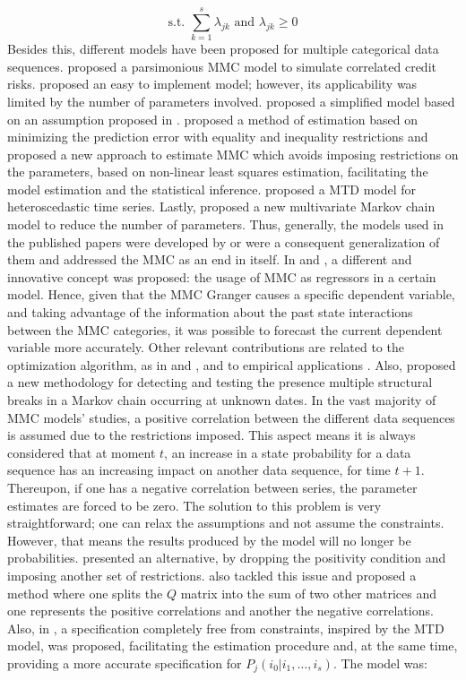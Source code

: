 \[ \text{s.t. } \sum_{k=1}^s \lambda_{jk} \text{ and } \lambda_{jk}  \geq 0 \] Besides this, different models have been proposed for multiple categorical data sequences. \citet{Kijima2002} proposed a parsimonious MMC model to simulate correlated credit risks. \citet{Siu2005} proposed an easy to implement model; however, its applicability was limited by the number of parameters involved. \citet{Ching2008} proposed a simplified model based on an assumption proposed in \citet{Zhang2006}. \citet{Zhu2010} proposed a method of estimation based on minimizing the prediction error with equality and inequality restrictions and \citet{Nicolau_2014} proposed a new approach to estimate MMC which avoids imposing restrictions on the parameters, based on non-linear least squares estimation, facilitating the model estimation and the statistical inference. \citet{Berchtold2003} proposed a MTD model for heteroscedastic time series. Lastly, \citet{Wang2014} proposed a new multivariate Markov chain model to reduce the number of parameters. Thus, generally, the models used in the published papers were developed by \citet{Ching2002} or were a consequent generalization of them and addressed the MMC as an end in itself. In \citet{Damasio2013} and \citet{DAMASIO2014}, a different and innovative concept was proposed: the usage of MMC as regressors in a certain model. Hence, given that the MMC Granger causes a specific dependent variable, and taking advantage of the information about the past state interactions between the MMC categories, it was possible to forecast the current dependent variable more accurately. Other relevant contributions are related to the optimization algorithm, as in \citet{Lebre2008} and \citet{ChenLio2009}, and to empirical applications \citep{Ching2003, Ching2006, Damasio2018, Damasio2019, DamasioM2020}. Also, \citet{Damasio2020} proposed a new methodology for detecting and testing the presence multiple structural breaks in a Markov chain occurring at unknown dates. In the vast majority of MMC models' studies, a positive correlation between the different data sequences is assumed due to the restrictions imposed. This aspect means it is always considered that at moment \(t\), an increase in a state probability for a data sequence has an increasing impact on another data sequence, for time \(t+1\). Thereupon, if one has a negative correlation between series, the parameter estimates are forced to be zero. The solution to this problem is very straightforward; one can relax the assumptions and not assume the constraints. However, that means the results produced by the model will no longer be probabilities. \citet{Tavare1994} presented an alternative, by dropping the positivity condition and imposing another set of restrictions. \citet{Ching2008} also tackled this issue and proposed a method where one splits the \(Q\) matrix into the sum of two other matrices and one represents the positive correlations and another the negative correlations. Also, in \citet{Nicolau2014}, a specification completely free from constraints, inspired by the MTD model, was proposed, facilitating the estimation procedure and, at the same time, providing a more accurate specification for \(P_j(i_0 | i_1, \dots, i_s)\). The model was:

